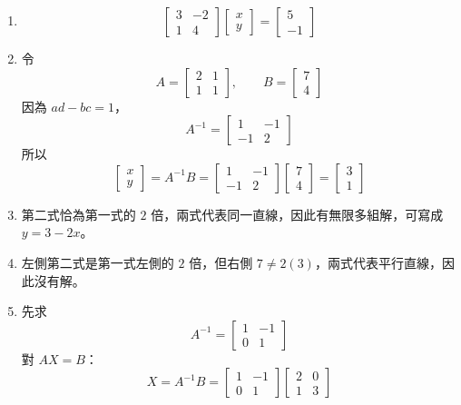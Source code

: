 \documentclass[11pt,a4paper]{article}
\begin{document}
\begin{enumerate}
\def\labelenumi{\arabic{enumi}.}
\item
  \[
   \begin{bmatrix}3&-2\\1&4\end{bmatrix}
   \begin{bmatrix}x\\y\end{bmatrix}
   =\begin{bmatrix}5\\-1\end{bmatrix}
   \]
\item
  令
  \[A=\begin{bmatrix}2&1\\1&1\end{bmatrix},\qquad B=\begin{bmatrix}7\\4\end{bmatrix}\]
  因為 \(ad-bc=1\)，
  \[A^{-1}=\begin{bmatrix}1&-1\\-1&2\end{bmatrix}\]
  所以
  \[
  \begin{bmatrix}x\\y\end{bmatrix}
  =A^{-1}B
  =\begin{bmatrix}1&-1\\-1&2\end{bmatrix}
  \begin{bmatrix}7\\4\end{bmatrix}
  =\begin{bmatrix}3\\1\end{bmatrix}
  \]
\item
  第二式恰為第一式的 \(2\) 倍，兩式代表同一直線，因此有無限多組解，可寫成 \(y=3-2x\)。
\item
  左側第二式是第一式左側的 \(2\) 倍，但右側 \(7\ne2(3)\)，兩式代表平行直線，因此沒有解。
\item
  先求
  \[A^{-1}=\begin{bmatrix}1&-1\\0&1\end{bmatrix}\]
  對 \(AX=B\)：
  \[
  X=A^{-1}B
  =\begin{bmatrix}1&-1\\0&1\end{bmatrix}
  \begin{bmatrix}2&0\\1&3\end{bmatrix}
\]
\end{enumerate}
\end{document}
